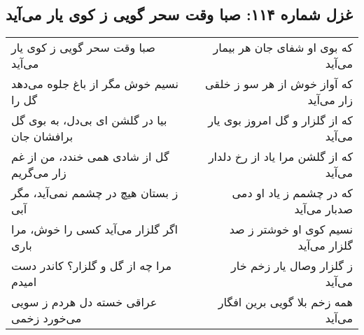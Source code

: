 \begin{center}
\section*{غزل شماره ۱۱۴: صبا وقت سحر گویی ز کوی یار می‌آید}
\label{sec:114}
\begin{longtable}{l p{0.5cm} r}
صبا وقت سحر گویی ز کوی یار می‌آید
&&
که بوی او شفای جان هر بیمار می‌آید
\\
نسیم خوش مگر از باغ جلوه می‌دهد گل را
&&
که آواز خوش از هر سو ز خلقی زار می‌آید
\\
بیا در گلشن ای بی‌دل، به بوی گل برافشان جان
&&
که از گلزار و گل امروز بوی یار می‌آید
\\
گل از شادی همی خندد، من از غم زار می‌گریم
&&
که از گلشن مرا یاد از رخ دلدار می‌آید
\\
ز بستان هیچ در چشمم نمی‌آید، مگر آبی
&&
که در چشمم ز یاد او دمی صدبار می‌آید
\\
اگر گلزار می‌آید کسی را خوش، مرا باری
&&
نسیم کوی او خوشتر ز صد گلزار می‌آید
\\
مرا چه از گل و گلزار؟ کاندر دست امیدم
&&
ز گلزار وصال یار زخم خار می‌آید
\\
عراقی خسته دل هردم ز سویی می‌خورد زخمی
&&
همه زخم بلا گویی برین افگار می‌آید
\\
\end{longtable}
\end{center}
